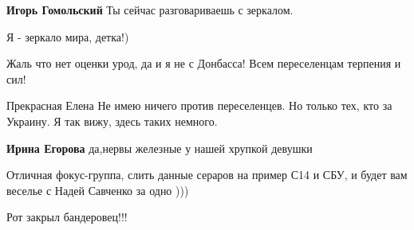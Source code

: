 \begin{itemize}
\begin{itemize}
\textbf{Игорь Гомольский} Ты сейчас разговариваешь с зеркалом.

 
Я - зеркало мира, детка!)

 
Жаль что нет оценки урод, да и я не с Донбасса! Всем переселенцам терпения и сил!

 
Прекрасная Елена Не имею ничего против переселенцев. Но только тех, кто за Украину. Я так вижу, здесь таких немного.

 
\textbf{Ирина Егорова} да,нервы железные у нашей хрупкой девушки

 
Отличная фокус-группа, слить данные сераров на пример С14 и СБУ, и будет вам веселье с Надей Савченко за одно )))

 
Рот закрыл бандеровец!!!

 

\end{itemize}
\end{itemize}
